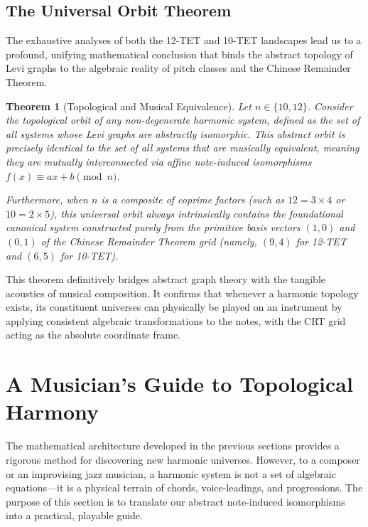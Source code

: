 \documentclass[11pt,letterpaper]{amsart}
\newtheorem{theorem}{Theorem}
\begin{document}
\subsection{The Universal Orbit Theorem}

The exhaustive analyses of both the 12-TET and 10-TET landscapes lead us to a profound, unifying mathematical conclusion that binds the abstract topology of Levi graphs to the algebraic reality of pitch classes and the Chinese Remainder Theorem.

\begin{theorem}[Topological and Musical Equivalence]
Let $n \in \{10, 12\}$. Consider the topological orbit of any non-degenerate harmonic system, defined as the set of all systems whose Levi graphs are abstractly isomorphic. This abstract orbit is precisely identical to the set of all systems that are musically equivalent, meaning they are mutually interconnected via affine note-induced isomorphisms $f(x) \equiv ax+b \pmod{n}$. 

Furthermore, when $n$ is a composite of coprime factors (such as $12 = 3 \times 4$ or $10 = 2 \times 5$), this universal orbit always intrinsically contains the foundational canonical system constructed purely from the primitive basis vectors $(1,0)$ and $(0,1)$ of the Chinese Remainder Theorem grid (namely, $(9,4)$ for 12-TET and $(6,5)$ for 10-TET).
\end{theorem}

This theorem definitively bridges abstract graph theory with the tangible acoustics of musical composition. It confirms that whenever a harmonic topology exists, its constituent universes can physically be played on an instrument by applying consistent algebraic transformations to the notes, with the CRT grid acting as the absolute coordinate frame.


\section{A Musician's Guide to Topological Harmony}
\label{sec:musicians_guide}

The mathematical architecture developed in the previous sections provides a rigorous method for discovering new harmonic universes. However, to a composer or an improvising jazz musician, a harmonic system is not a set of algebraic equations---it is a physical terrain of chords, voice-leadings, and progressions. The purpose of this section is to translate our abstract note-induced isomorphisms into a practical, playable guide.
\end{document}
